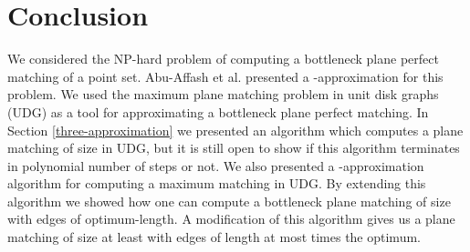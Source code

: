 \documentclass[11pt,a4paper]{article}
\begin{document}
\section{Conclusion}
\label{conclusion}
We considered the NP-hard problem of computing a bottleneck plane perfect matching of a point set. Abu-Affash et al. \cite{Abu-Affash2014} presented a -approximation for this problem. We used the maximum plane matching problem in unit disk graphs (UDG) as a tool for approximating a bottleneck plane perfect matching. In Section \ref{three-approximation} we presented an algorithm which computes a plane matching of size  in UDG, but it is still open to show if this algorithm terminates in polynomial number of steps or not. We also presented a -approximation algorithm for computing a maximum matching in UDG. By extending this algorithm we showed how one can compute a bottleneck plane matching of size  with edges of optimum-length. A modification of this algorithm gives us a plane matching of size at least  with  edges of length at most  times the optimum. 



\end{document}
